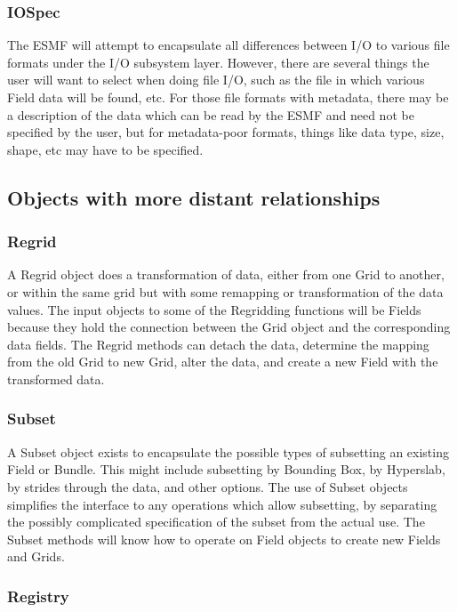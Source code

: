 \subsubsection{IOSpec}

The ESMF will attempt to encapsulate 
all differences between I/O to various file formats
under the I/O subsystem layer.  However, there are
several things the user will want to select when
doing file I/O, such as the file in which various
Field data will be found, etc.  For those file formats
with metadata, there may be a description of the data
which can be read by the ESMF and need not be
specified by the user, but for metadata-poor formats,
things like data type, size, shape, etc may have to
be specified.

\subsection{Objects with more distant relationships}

\subsubsection{Regrid}

A Regrid object does a transformation of data, either from
one Grid to another, or within the same grid but with some remapping
or transformation of the data values.  The input objects to
some of the Regridding functions will be Fields because they
hold the connection between the Grid object and the corresponding
data fields.  The Regrid methods can detach the data, determine
the mapping from the old Grid to new Grid, alter the data, and
create a new Field with the transformed data.

\subsubsection{Subset}

A Subset object 
exists to encapsulate the possible types of subsetting an existing
Field or Bundle.  This might include subsetting by Bounding Box,
by Hyperslab, by strides through the data, and other options.
The use of Subset objects simplifies the interface to
any operations which allow subsetting, by separating the
possibly complicated specification of the subset from the
actual use.  The Subset methods will know how to operate on Field
objects to create new Fields and Grids.

\subsubsection{Registry}

